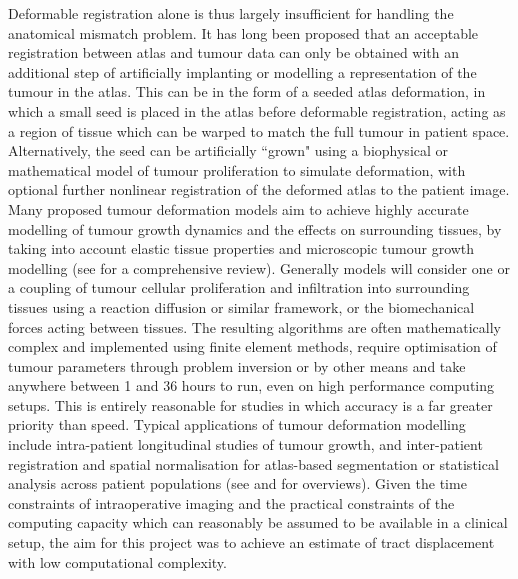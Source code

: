 Deformable registration alone is thus largely insufficient for handling the anatomical mismatch problem. \autocite{Elazab2018, Visser2020}
It has long been proposed that an acceptable registration between atlas and tumour data can only be obtained with an additional step of artificially implanting or modelling a representation of the tumour in the atlas.\autocite{Cabezas2011,Mang2020}
This can be in the form of a seeded atlas deformation,\autocite{Dawant2002} in which a small seed is placed in the atlas before deformable registration, acting as a region of tissue which can be warped to match the full tumour in patient space.
Alternatively, the seed can be artificially ``grown" using a biophysical or mathematical model of tumour proliferation to simulate deformation, with optional further nonlinear registration of the deformed atlas to the patient image.\autocite{Cuadra2004, Zacharaki2009}
Many proposed tumour deformation models aim to achieve highly accurate modelling of tumour growth dynamics and the effects on surrounding tissues, by taking into account elastic tissue properties and microscopic tumour growth modelling (see \textcite{Elazab2018} for a comprehensive review).
Generally models will consider one or a coupling\autocite{Clatz2005,Hogea2007,Prastawa2009} of tumour cellular proliferation and infiltration into surrounding tissues using a reaction diffusion or similar framework,\autocite{Tunc2021,Scheufele2019b,Elaff2018}
or the biomechanical forces acting between tissues.\autocite{Mohamed2006,Hogea2007a,Zacharaki2009}
The resulting algorithms are often mathematically complex and implemented using finite element methods,\autocite{Elazab2018} require optimisation of tumour parameters through problem inversion or by other means \autocite{Mohamed2006, Zacharaki2009, Mang2020} and take anywhere between 1 and 36 hours to run, even on high performance computing setups.\autocite{Zacharaki2009,Bauer2012,Gooya2012,Bauer2013,Mang2012}
This is entirely reasonable for studies in which accuracy is a far greater priority than speed.
Typical applications of tumour deformation modelling include intra-patient longitudinal studies of tumour growth, and inter-patient registration and spatial normalisation for atlas-based segmentation or statistical analysis across patient populations (see \textcite{Bauer2013} and \textcite{Cabezas2011} for overviews).
Given the time constraints of intraoperative imaging and the practical constraints of the computing capacity which can reasonably be assumed to be available in a clinical setup, the aim for this project was to achieve an estimate of tract displacement with low computational complexity.

